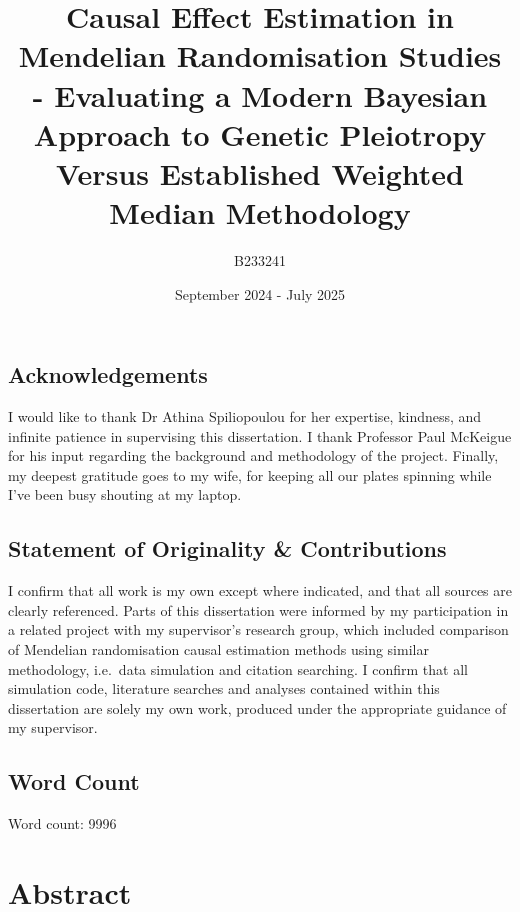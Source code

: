 \documentclass[
]{article}
\title{Causal Effect Estimation in Mendelian Randomisation Studies - Evaluating a Modern Bayesian Approach to Genetic Pleiotropy Versus Established Weighted Median Methodology}
\author{B233241}
\date{September 2024 - July 2025}
\begin{document}
\maketitle

{
\hypersetup{linkcolor=}
\setcounter{tocdepth}{2}
\tableofcontents
}
\newpage

\subsection*{Acknowledgements}\label{acknowledgements}

I would like to thank Dr Athina Spiliopoulou for her expertise, kindness, and infinite patience in supervising this dissertation. I thank Professor Paul McKeigue for his input regarding the background and methodology of the project. Finally, my deepest gratitude goes to my wife, for keeping all our plates spinning while I've been busy shouting at my laptop.

\subsection*{Statement of Originality \& Contributions}\label{statement-of-originality-contributions}

I confirm that all work is my own except where indicated, and that all sources are clearly referenced. Parts of this dissertation were informed by my participation in a related project with my supervisor's research group, which included comparison of Mendelian randomisation causal estimation methods using similar methodology, i.e.~data simulation and citation searching. I confirm that all simulation code, literature searches and analyses contained within this dissertation are solely my own work, produced under the appropriate guidance of my supervisor.

\subsection*{Word Count}\label{word-count}

Word count:
9996

\newpage

\section{Abstract}\label{abstract}
\end{document}
